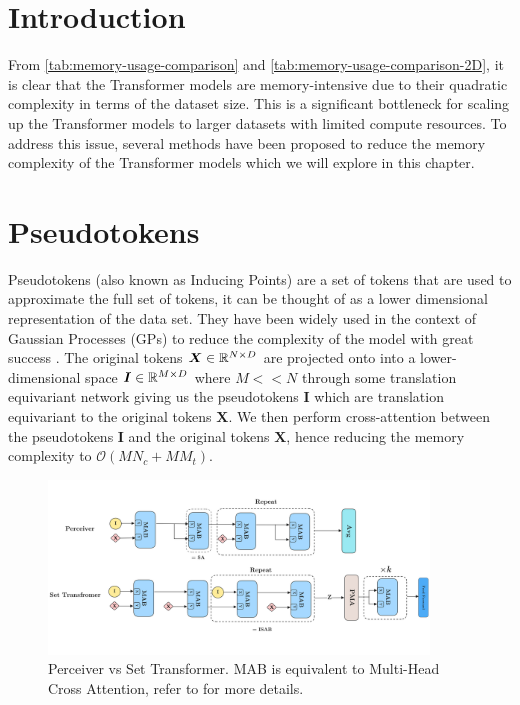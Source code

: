 \documentclass[../../main.tex]{subfiles}
\begin{document}
\section{Introduction}


From \autoref{tab:memory-usage-comparison} and \autoref{tab:memory-usage-comparison-2D}, it is clear that the Transformer models are memory-intensive due to their quadratic complexity in terms of the dataset size. This is a significant bottleneck for scaling up the Transformer models to larger datasets with limited compute resources. To address this issue, several methods have been proposed to reduce the memory complexity of the Transformer models which we will explore in this chapter.

\section{Pseudotokens}

Pseudotokens (also known as Inducing Points) are a set of tokens that are used to approximate the full set of tokens, it can be thought of as a lower dimensional representation of the data set. They have been widely used in the context of Gaussian Processes (GPs) to reduce the complexity of the model with great success \cite{hensman2013gaussian}. The original tokens $\bm{X} \in \mathbb{R}^{N \times D}$ are projected onto into a lower-dimensional space $\bm{I} \in \mathbb{R}^{M \times D}$ where $M << N$ through some translation equivariant network \cite{anonymous2024translationequivariant} giving us the pseudotokens $\bm{I}$ which are translation equivariant to the original tokens $\bm{X}$. We then perform cross-attention between the pseudotokens $\bm{I}$ and the original tokens $\bm{X}$, hence reducing the memory complexity to $\mathcal{O}(MN_c + MM_t)$. 



\begin{figure}[H]
    \centering
    \includegraphics[width=0.9\textwidth]{fig/set-transformer.png}
    \caption{Perceiver vs Set Transformer. MAB is equivalent to Multi-Head Cross Attention, refer to \cite{jaegle2021perceiver, lee2019set} for more details.}
    \label{fig:set-transformer}
\end{figure}
\end{document}
